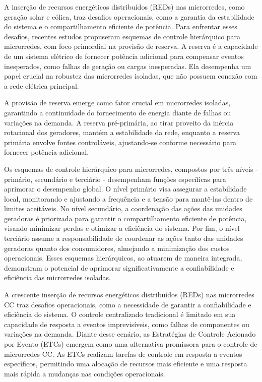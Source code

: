 A inserção de recursos energéticos distribuídos (REDs) nas microrredes, como geração solar e eólica, traz desafios operacionais, como a garantia da estabilidade do sistema e o compartilhamento eficiente de potência. Para enfrentar esses desafios, recentes estudos propuseram esquemas de controle hierárquico para microrredes, com foco primordial na provisão de reserva. A reserva é a capacidade de um sistema elétrico de fornecer potência adicional para compensar eventos inesperados, como falhas de geração ou cargas inesperadas. Ela desempenha um papel crucial na robustez das microrredes isoladas, que não possuem conexão com a rede elétrica principal.

A provisão de reserva emerge como fator crucial em microrredes isoladas, garantindo a continuidade do fornecimento de energia diante de falhas ou variações na demanda. A reserva pré-primária, ao tirar proveito da inércia rotacional dos geradores, mantém a estabilidade da rede, enquanto a reserva primária envolve fontes controláveis, ajustando-se conforme necessário para fornecer potência adicional.

Os esquemas de controle hierárquico para microrredes, compostos por três níveis - primário, secundário e terciário - desempenham funções específicas para aprimorar o desempenho global. O nível primário visa assegurar a estabilidade local, monitorando e ajustando a frequência e a tensão para mantê-las dentro de limites aceitáveis. No nível secundário, a coordenação das ações das unidades geradoras é priorizada para garantir o compartilhamento eficiente de potência, visando minimizar perdas e otimizar a eficiência do sistema. Por fim, o nível terciário assume a responsabilidade de coordenar as ações tanto das unidades geradoras quanto dos consumidores, almejando a minimização dos custos operacionais. Esses esquemas hierárquicos, ao atuarem de maneira integrada, demonstram o potencial de aprimorar significativamente a confiabilidade e eficiência das microrredes isoladas.

A crescente inserção de recursos energéticos distribuídos (REDs) nas microrredes CC traz desafios operacionais, como a necessidade de garantir a confiabilidade e eficiência do sistema. O controle centralizado tradicional é limitado em sua capacidade de resposta a eventos imprevisíveis, como falhas de componentes ou variações na demanda. Diante desse cenário, as Estratégias de Controle Acionado por Evento (ETCs) emergem como uma alternativa promissora para o controle de microrredes CC. As ETCs realizam tarefas de controle em resposta a eventos específicos, permitindo uma alocação de recursos mais eficiente e uma resposta mais rápida a mudanças nas condições operacionais.

